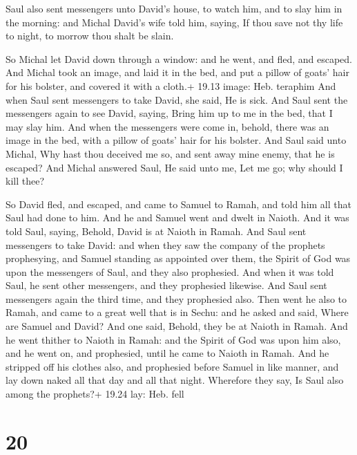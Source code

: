  Saul also sent messengers unto David's house, to watch
him, and to slay him in the morning: and Michal David's wife told him,
saying, If thou save not thy life to night, to morrow thou shalt be
slain.

 So Michal let David down through a window: and he went,
and fled, and escaped.  And Michal took an image, and laid
it in the bed, and put a pillow of goats' hair for his bolster, and
covered it with a cloth.+ 19.13 image: Heb. teraphim  And
when Saul sent messengers to take David, she said, He is sick.
 And Saul sent the messengers again to see David, saying,
Bring him up to me in the bed, that I may slay him.  And
when the messengers were come in, behold, there was an image in the bed,
with a pillow of goats' hair for his bolster.  And Saul
said unto Michal, Why hast thou deceived me so, and sent away mine
enemy, that he is escaped? And Michal answered Saul, He said unto me,
Let me go; why should I kill thee?

 So David fled, and escaped, and came to Samuel to Ramah,
and told him all that Saul had done to him. And he and Samuel went and
dwelt in Naioth.  And it was told Saul, saying, Behold,
David is at Naioth in Ramah.  And Saul sent messengers to
take David: and when they saw the company of the prophets prophesying,
and Samuel standing as appointed over them, the Spirit of God was upon
the messengers of Saul, and they also prophesied.  And when
it was told Saul, he sent other messengers, and they prophesied
likewise. And Saul sent messengers again the third time, and they
prophesied also.  Then went he also to Ramah, and came to a
great well that is in Sechu: and he asked and said, Where are Samuel and
David? And one said, Behold, they be at Naioth in Ramah. 
And he went thither to Naioth in Ramah: and the Spirit of God was upon
him also, and he went on, and prophesied, until he came to Naioth in
Ramah.  And he stripped off his clothes also, and
prophesied before Samuel in like manner, and lay down naked all that day
and all that night. Wherefore they say, Is Saul also among the
prophets?+ 19.24 lay: Heb. fell

\hypertarget{section-19}{%
\section{20}\label{section-19}}

